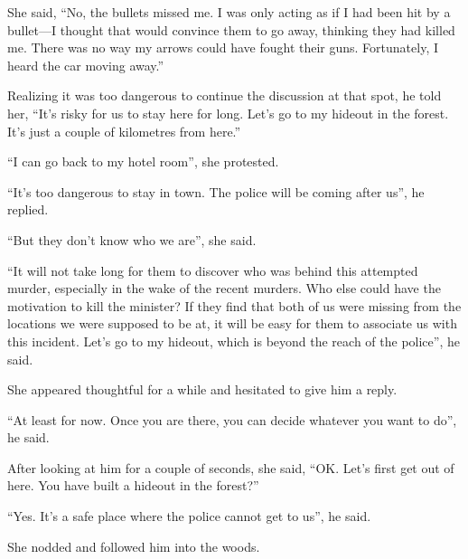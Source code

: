 She said, “No, the bullets missed me. I was only acting as if I had been hit by a bullet—I
thought that would convince them to go away, thinking they had killed me. There
was no way my arrows could have fought their guns. Fortunately, I heard the car
moving away.”

Realizing it was too dangerous to continue the discussion at that spot, he told
her, “It's risky for us to stay here for long. Let's go to my hideout in the
forest. It's just a couple of kilometres from here.”

“I can go back to my hotel room”, she protested.

“It's too dangerous to stay in town. The police will be coming after us”, he
replied.

“But they don't know who we are”, she said.

“It will not take long for them to discover who was behind this attempted
murder, especially in the wake of the recent murders. Who else could have the
motivation to kill the minister? If they find that both of us were missing from
the locations we were supposed to be at, it will be easy for them to associate us
with this incident. Let's go to my hideout, which is beyond the reach of the
police”, he said.

She appeared thoughtful for a while and hesitated to give him a reply.

“At least for now. Once you are there, you can decide whatever you want to do”,
he said.

After looking at him for a couple of seconds, she said, “OK. Let's first get out
of here. You have built a hideout in the forest?”

“Yes. It's a safe place where the police cannot get to us”, he said.

She nodded and followed him into the woods.